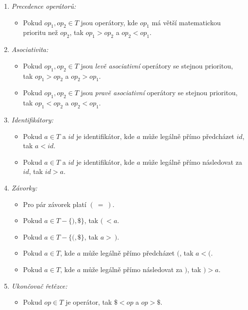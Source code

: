 \begin{enumerate}
  \item \emph{Precedence operátorů:}
    \begin{itemize}
      \item Pokud $op_1, op_2 \in T$ jsou operátory, kde $op_1$ má větší matematickou prioritu než $op_2$, tak $op_1 > op_2$ a $op_2 < op_1$.
    \end{itemize}
  \item \emph{Asociativita:}
    \begin{itemize}
      \item Pokud $op_1, op_2 \in T$ jsou \emph{levě asociativní} operátory se stejnou prioritou, tak $op_1 > op_2$ a  $op_2 > op_1$.
      \item Pokud $op_1, op_2 \in T$ jsou \emph{pravě asociativní} operátory se stejnou prioritou, tak $op_1 < op_2$ a  $op_2 < op_1$.
    \end{itemize}
  \item \emph{Identifikátory:}
    \begin{itemize}
      \item Pokud $a \in T$ a $id$ je identifikátor, kde $a$ může legálně přímo předcházet $id$, tak $a < id$.
      \item Pokud $a \in T$ a $id$ je identifikátor, kde $a$ může legálně přímo následovat za $id$, tak $id > a$.
    \end{itemize}
  \item \emph{Závorky:}
    \begin{itemize}
      \item Pro pár závorek platí $(\ =\ )$.
      \item Pokud $a \in T - \{), \$\}$, tak $(\ < a$.
      \item Pokud $a \in T - \{(, \$\}$, tak $a >\ )$.
      \item Pokud $a \in T$, kde $a$ může legálně přímo předcházet $($, tak $a < ($.
      \item Pokud $a \in T$, kde $a$ může legálně přímo následovat za $)$, tak $) > a$.
    \end{itemize}
  \item \emph{Ukončovač řetězce:}
    \begin{itemize}
      \item Pokud $op \in T$ je operátor, tak $\$ < op$ a $op > \$$.
    \end{itemize}
\end{enumerate}

